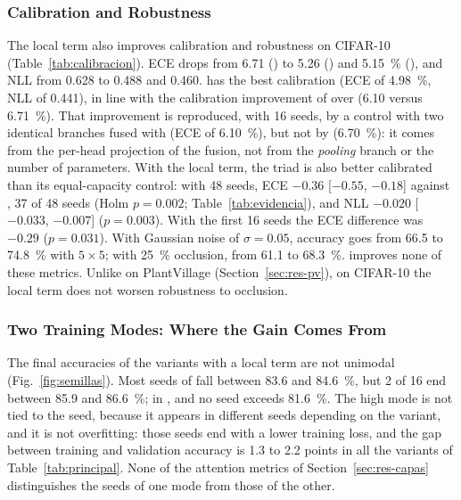 \subsubsection{Calibration and Robustness}
\label{sec:res-calibracion}
The local term also improves calibration and robustness on CIFAR-10 (Table~\ref{tab:calibracion}). ECE drops from 6.71 () to 5.26 () and 5.15~\% (), and NLL from 0.628 to 0.488 and 0.460.  has the best calibration (ECE of 4.98~\%, NLL of 0.441), in line with the calibration improvement of  over  (6.10 versus 6.71~\%). That improvement is reproduced, with 16 seeds, by a control with two identical  branches fused with  (ECE of 6.10~\%), but not by  (6.70~\%): it comes from the per-head projection of the fusion, not from the \emph{pooling} branch or the number of parameters. With the local term, the triad is also better calibrated than its equal-capacity control: with 48 seeds, ECE $-0.36$ [$-0.55$, $-0.18$] against , 37 of 48 seeds (Holm $p=0.002$; Table~\ref{tab:evidencia}), and NLL $-0.020$ [$-0.033$, $-0.007$] ($p=0.003$). With the first 16 seeds the ECE difference was $-0.29$ ($p=0.031$). With Gaussian noise of $\sigma=0.05$, accuracy goes from 66.5 to 74.8~\% with $5\times5$; with 25~\% occlusion, from 61.1 to 68.3~\%.  improves none of these metrics. Unlike on PlantVillage (Section~\ref{sec:res-pv}), on CIFAR-10 the local term does not worsen robustness to occlusion.



\subsubsection{Two Training Modes: Where the Gain Comes From}
\label{sec:res-modos}
The final accuracies of the variants with a local term are not unimodal (Fig.~\ref{fig:semillas}). Most seeds of  fall between 83.6 and 84.6~\%, but 2 of 16 end between 85.9 and 86.6~\%; in ,  and  no seed exceeds 81.6~\%. The high mode is not tied to the seed, because it appears in different seeds depending on the variant, and it is not overfitting: those seeds end with a lower training loss, and the gap between training and validation accuracy is 1.3 to 2.2 points in all the variants of Table~\ref{tab:principal}. None of the attention metrics of Section~\ref{sec:res-capas} distinguishes the seeds of one mode from those of the other.

